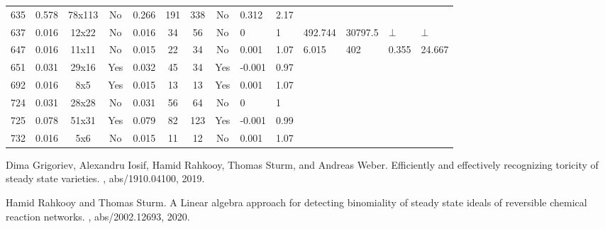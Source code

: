 \documentclass[11pt]{article}
\begin{document}
\begin{landscape}
\begin{small}
\begin{longtable}[c]{| c | c | c | c |c |c |c |c |p{1.5cm} |p{1.5cm} |p{1.5cm} |p{1.5cm} |p{1.5cm} |p{1.5cm} |}
635 & 0.578 & 78x113 & No & 0.266 & 191 & 338 & No & 0.312 & 2.17 &  &  &  & \\
637 & 0.016 & 12x22 & No & 0.016 & 34 & 56 & No & 0 & 1 & 492.744 & 30797.5 & $\bot$ & $\bot$\\
647 & 0.016 & 11x11 & No & 0.015 & 22 & 34 & No & 0.001 & 1.07 & 6.015 & 402 & 0.355 & 24.667\\
651 & 0.031 & 29x16 & Yes & 0.032 & 45 & 34 & Yes & -0.001 & 0.97 &  &  &  & \\
692 & 0.016 & 8x5 & Yes & 0.015 & 13 & 13 & Yes & 0.001 & 1.07 &  &  &  & \\
724 & 0.031 & 28x28 & No & 0.031 & 56 & 64 & No & 0 & 1 &  &  &  & \\
725 & 0.078 & 51x31 & Yes & 0.079 & 82 & 123 & Yes & -0.001 & 0.99 &  &  &  & \\
732 & 0.016 & 5x6 & No & 0.015 & 11 & 12 & No & 0.001 & 1.07 &  &  &  & \\


 \end{longtable}

\end{small}

\end{landscape}
\begin{thebibliography}{10}
Dima Grigoriev, Alexandru Iosif, Hamid Rahkooy, Thomas Sturm, and Andreas
  Weber.
\newblock Efficiently and effectively recognizing toricity of steady state
  varieties.
, abs/1910.04100, 2019.


Hamid Rahkooy and Thomas Sturm.
\newblock A Linear algebra approach for detecting binomiality of steady state ideals of reversible chemical reaction networks.
, abs/2002.12693, 2020.


\end{thebibliography}
\end{document}

